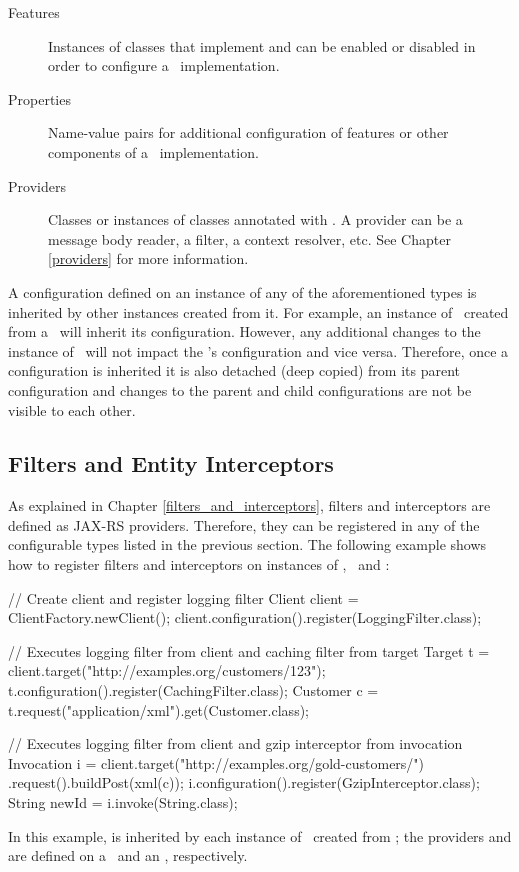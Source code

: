 \begin{description}
\item [Features] Instances of classes that implement  and can be enabled or disabled in order to configure a \jaxrs\ implementation.
\item [Properties] Name-value pairs for additional configuration of features or other components of a \jaxrs\ implementation.
\item [Providers] Classes or instances of classes annotated with \Provider. A provider can be a message body reader, a filter, a context resolver, etc. See Chapter \ref{providers} for more information.
\end{description}

A configuration defined on an instance of any of the aforementioned types is inherited by other instances created from it. For example, an instance of \Target\ created from a \Client\ will inherit its configuration. However, any additional changes to the instance of \Target\ will not impact the \Client's configuration and vice versa. Therefore, once a configuration is inherited it is also detached (deep copied) from its parent configuration and changes to the parent and child configurations are not be visible to each other.

\subsection{Filters and Entity Interceptors}
\label{filters_interceptors_client}

As explained in Chapter \ref{filters_and_interceptors}, filters and interceptors are defined as JAX-RS providers. Therefore, they can be registered in any of the configurable types listed in the previous section. The following example shows how to register filters and interceptors on instances of \Client, \Target\ and \Invocation:

\begin{listing}{1}
// Create client and register logging filter
Client client = ClientFactory.newClient();
client.configuration().register(LoggingFilter.class);

// Executes logging filter from client and caching filter from target
Target t = client.target("http://examples.org/customers/123");
t.configuration().register(CachingFilter.class);
Customer c = t.request("application/xml").get(Customer.class);

// Executes logging filter from client and gzip interceptor from invocation
Invocation i = client.target("http://examples.org/gold-customers/")
    .request().buildPost(xml(c));
i.configuration().register(GzipInterceptor.class);
String newId = i.invoke(String.class);
\end{listing}

In this example,  is inherited by each instance of \Target\ created from ; the providers  and  are defined on a \Target\ and an \Invocation, respectively.








